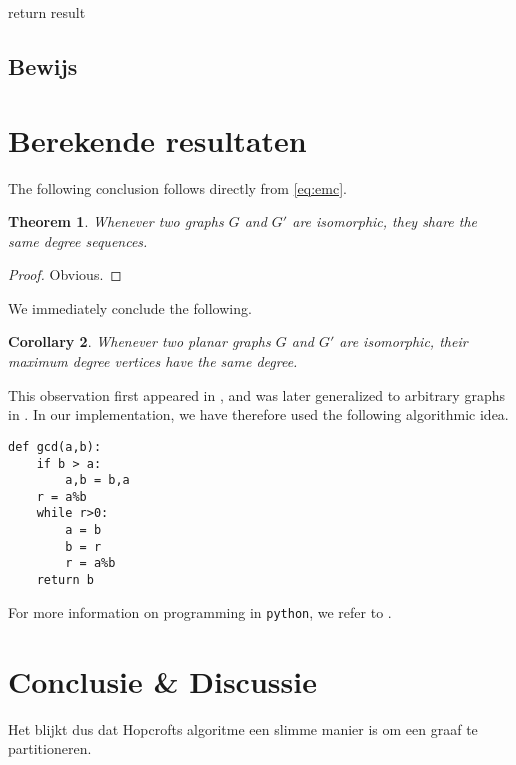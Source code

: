 \documentclass[twoside]{article}
\newtheorem{theorem}{Theorem}[section]
\newtheorem{corollary}[theorem]{Corollary}
\begin{document}
\begin{multicols}{2}
\begin{algorithm}[H]
return result
 

\caption{$ generate\_dcount $}
\end{algorithm}




\subsection{Bewijs}

\section{Berekende resultaten}

The following conclusion follows directly from \eqref{eq:emc}.
\lipsum[6] %
\begin{theorem}
Whenever two graphs $G$ and $G'$ are isomorphic, they share the same degree sequences.
\end{theorem}
\begin{proof}
Obvious.
\end{proof}
We immediately conclude the following.
\begin{corollary}
Whenever two planar graphs $G$ and $G'$ are isomorphic, their maximum degree vertices have the same degree. 
\end{corollary}
This observation first appeared in , and was later generalized to arbitrary graphs in .
In our implementation, we have therefore used the following algorithmic idea.
\begin{verbatim}
def gcd(a,b):
    if b > a:
        a,b = b,a
    r = a%b
    while r>0:
        a = b
        b = r
        r = a%b
    return b
\end{verbatim}
For more information on programming in {\tt python}, we refer to\cite{jaco} \cite{MR0403320}.

\section{Conclusie \& Discussie}
Het blijkt dus dat Hopcrofts algoritme een slimme manier is om een graaf te partitioneren. 

\lipsum[8] %


 




\end{multicols}
\end{document}
